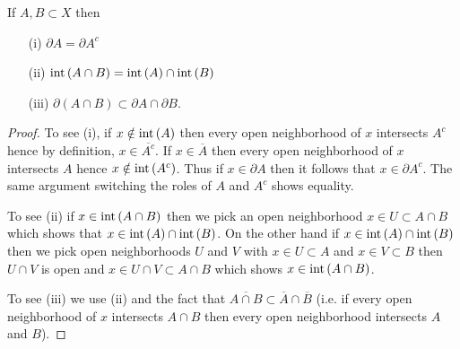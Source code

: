 \begin{prop}\label{BoundaryComplement}If $A, B \subset X$ then 
\begin{itemize}
\item[(i)] $\partial A = \partial A^c$
\item[(ii)] $\operatorname*{int} \left( A \cap B \right) = \operatorname*{int} \left( A \right) \cap \operatorname*{int} \left( B \right)$
\item[(iii)] $\partial (A \cap B) \subset \partial A \cap \partial B$.
\end{itemize}
\end{prop}
\begin{proof}
To see (i), if $x \notin \operatorname*{int} \left( A \right)$ then every open neighborhood of $x$ intersects $A^c$ hence by definition, $x \in \overline{A^c}$.  If $x \in \overline{A}$ then every open neighborhood of $x$ intersects $A$ hence $x \notin \operatorname*{int} \left( A^c \right)$.  Thus if $x \in \partial A$ then it follows that $x \in \partial A^c$.  The same argument switching the roles of $A$ and $A^c$ shows equality.

To see (ii) if $x \in \operatorname*{int} \left( A \cap B \right)$ then we pick an open neighborhood $x \in U \subset A \cap B$ which shows that $x \in \operatorname*{int} \left( A \right) \cap \operatorname*{int} \left( B \right)$.  On the other hand if $x \in \operatorname*{int} \left( A \right) \cap \operatorname*{int} \left( B \right)$ then we pick open neighborhoods $U$ and $V$ with $x \in U \subset A$ and $x \in V \subset B$ then $U \cap V$ is open and $x \in U \cap V \subset A \cap B$ which shows $x \in \operatorname*{int} \left( A \cap B \right)$.

To see (iii) we use (ii) and the fact that $\overline{A \cap B} \subset \overline{A} \cap \overline{B}$ (i.e. if every open neighborhood of $x$ intersects $A \cap B$ then every open neighborhood intersects $A$ and $B$).
\end{proof}

